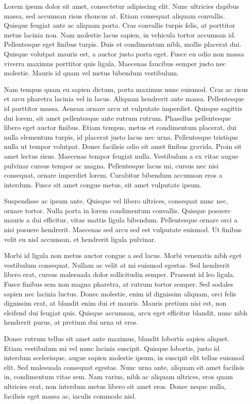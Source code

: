 \Introduction

Lorem ipsum dolor sit amet, consectetur adipiscing elit. Nunc ultricies dapibus massa, sed accumsan risus rhoncus at. Etiam consequat aliquam convallis. Quisque feugiat ante ac aliquam porta. Cras convallis turpis felis, at porttitor metus lacinia non. Nam molestie lacus sapien, in vehicula tortor accumsan id. Pellentesque eget finibus turpis. Duis et condimentum nibh, mollis placerat dui. Quisque volutpat mauris est, a auctor justo porta eget. Fusce eu odio non massa viverra maximus porttitor quis ligula. Maecenas faucibus semper justo nec molestie. Mauris id quam vel metus bibendum vestibulum.

Nam tempus quam eu sapien dictum, porta maximus nunc euismod. Cras ac risus et arcu pharetra lacinia vel in lacus. Aliquam hendrerit ante massa. Pellentesque id porttitor massa. Aenean ornare arcu ut vulputate imperdiet. Quisque sagittis dui lorem, sit amet pellentesque ante rutrum rutrum. Phasellus pellentesque libero eget auctor finibus. Etiam tempus, metus et condimentum placerat, dui nulla elementum turpis, id placerat justo lacus nec urna. Pellentesque tristique nulla ut tempor volutpat. Donec facilisis odio sit amet finibus gravida. Proin sit amet lectus risus. Maecenas tempor feugiat nulla. Vestibulum a ex vitae augue pulvinar cursus tempor ac magna. Pellentesque lacus mi, cursus nec nisi consequat, ornare imperdiet lorem. Curabitur bibendum accumsan eros a interdum. Fusce sit amet congue metus, sit amet vulputate ipsum.

Suspendisse ac ipsum ante. Quisque vel libero ultrices, consequat nunc nec, ornare tortor. Nulla porta in lorem condimentum convallis. Quisque posuere mauris a dui efficitur, vitae mattis ligula bibendum. Pellentesque ornare orci a nisi posuere hendrerit. Maecenas sed arcu sed est vulputate euismod. Ut finibus velit eu nisl accumsan, et hendrerit ligula pulvinar.

Morbi id ligula non metus auctor congue a sed lacus. Morbi venenatis nibh eget vestibulum consequat. Nullam ac velit at mi euismod egestas. Sed hendrerit libero erat, cursus malesuada dolor sollicitudin semper. Praesent id leo ligula. Fusce finibus sem non magna pharetra, at rutrum tortor semper. Sed sodales sapien nec lacinia luctus. Donec molestie, enim id dignissim aliquam, orci felis dignissim erat, at blandit enim dui et mauris. Mauris pretium nisi est, non eleifend dui feugiat quis. Quisque accumsan, arcu eget efficitur blandit, nunc nibh hendrerit purus, at pretium dui urna ut eros.

Donec rutrum tellus sit amet ante maximus, blandit lobortis sapien aliquet. Etiam vestibulum mi vel nunc lacinia suscipit. Quisque lobortis, justo id interdum scelerisque, augue sapien molestie ipsum, in suscipit elit tellus euismod elit. Sed malesuada consequat egestas. Nunc urna ante, aliquam sit amet facilisis in, condimentum vitae sem. Nam varius, nibh ac aliquam ultrices, eros quam ultricies erat, non interdum metus libero sit amet eros. Donec neque nulla, facilisis eget massa ac, iaculis commodo nisl. 